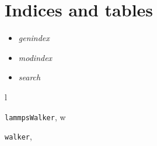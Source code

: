 \documentclass[letterpaper,10pt,english]{sphinxmanual}
\begin{document}
\chapter{Indices and tables}
\label{index:indices-and-tables}\begin{itemize}
\item {} 
\emph{genindex}

\item {} 
\emph{modindex}

\item {} 
\emph{search}

\end{itemize}


\renewcommand{\indexname}{Python Module Index}
\begin{theindex}
\def\bigletter#1{{\Large\sffamily#1}\nopagebreak\vspace{1mm}}
\bigletter{l}
\item {\texttt{lammpsWalker}}, \pageref{src/src.doc:module-lammpsWalker}
\indexspace
\bigletter{w}
\item {\texttt{walker}}, \pageref{src/src.doc:module-walker}
\end{theindex}

\renewcommand{\indexname}{Index}
\printindex
\end{document}
